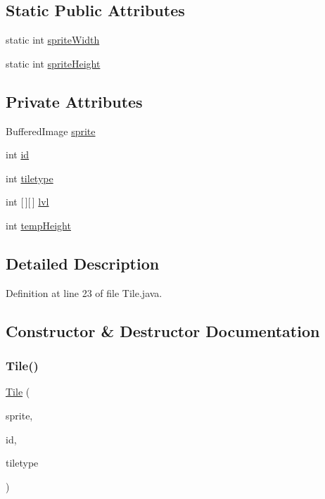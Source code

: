 \subsection*{Static Public Attributes}
\begin{DoxyCompactItemize}
\item 
static int \hyperlink{classobjects_1_1_tile_afbef0b8f1824dfedcb984b1547cc0dde}{sprite\+Width}
\item 
static int \hyperlink{classobjects_1_1_tile_af57e825c5781fcdc5e47e2eb5e553c4c}{sprite\+Height}
\end{DoxyCompactItemize}
\subsection*{Private Attributes}
\begin{DoxyCompactItemize}
\item 
Buffered\+Image \hyperlink{classobjects_1_1_tile_a596d0c3eea54a08f78cbad0a4fbec565}{sprite}
\item 
int \hyperlink{classobjects_1_1_tile_a7441ef0865bcb3db9b8064dd7375c1ea}{id}
\item 
int \hyperlink{classobjects_1_1_tile_aa7bcd46686997f7cbef377c22eed1c8d}{tiletype}
\item 
int \mbox{[}$\,$\mbox{]}\mbox{[}$\,$\mbox{]} \hyperlink{classobjects_1_1_tile_a4b06a2210cf5b93dda77f2a9a061d538}{lvl}
\item 
int \hyperlink{classobjects_1_1_tile_a6cb3d99320ebf80da884900b159d240e}{temp\+Height}
\end{DoxyCompactItemize}


\subsection{Detailed Description}


Definition at line 23 of file Tile.\+java.



\subsection{Constructor \& Destructor Documentation}
\mbox{\label{classobjects_1_1_tile_acbf8ab43b0cee998ab5f07f76d55fdee}} 
\subsubsection{\texorpdfstring{Tile()}{Tile()}}
{\footnotesize\ttfamily \hyperlink{classobjects_1_1_tile}{Tile} (\begin{DoxyParamCaption}\item[{Buffered\+Image}]{sprite,  }\item[{int}]{id,  }\item[{int}]{tiletype }\end{DoxyParamCaption})}




